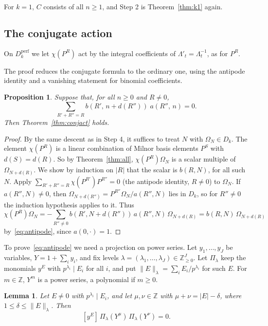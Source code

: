 \documentclass[11pt]{amsart}
\newtheorem{proposition}[theorem]{Proposition}
\newtheorem{lemma}[theorem]{Lemma}
\theoremstyle{definition}
\theoremstyle{remark}
\newcommand{\Dk}{D_k}
\newcommand{\Dperf}{D_k^{\mathrm{perf}}}
\newcommand{\coef}[1]{\left[#1\right]}
\begin{document}
For $k=1$, $C$ consists of all $n\ge1$, and Step 2 is
Theorem~\ref{thm:k1} again.

\subsection{The conjugate action}
On $\Dperf$ we let $\chi(P^R)$ act by the integral coefficients of
$\Lambda'_t=\Lambda_t^{-1}$, as for $P^R$.

The proof reduces the conjugate formula to the ordinary one, using the
antipode identity and a vanishing statement for binomial coefficients.

\begin{proposition}\label{prop:conj}
Suppose that, for all $n\ge0$ and $R\ne0$,
\begin{equation}\label{eq:antipode}
  \sum_{R'+R''=R}b(R',\,n+d(R''))\;a(R'',\,n)=0 .
\end{equation}
Then Theorem~\ref{thm:conjact} holds.
\end{proposition}

\begin{proof}
By the same descent as in Step 4, it suffices to treat $N$ with
$\Omega_N\in\Dk$.  The element $\chi(P^R)$ is a linear combination of Milnor
basis elements $P^S$ with $d(S)=d(R)$.  So by Theorem~\ref{thm:all},
$\chi(P^R)\Omega_N$ is a scalar multiple of $\Omega_{N+d(R)}$.  We show by
induction on $|R|$ that the scalar is $b(R,N)$, for all such $N$.  Apply
$\sum_{R'+R''=R}\chi(P^{R'})P^{R''}=0$ (the antipode identity, $R\ne0$) to
$\Omega_N$.  If $a(R'',N)\ne0$, then $\Omega_{N+d(R'')}=P^{R''}\Omega_N/a(R'',N)$
lies in $\Dk$, so for $R''\ne0$ the induction hypothesis applies to it.  Thus
\[
  \chi(P^R)\Omega_N=-\sum_{R''\ne0}b(R',N+d(R''))\,a(R'',N)\,\Omega_{N+d(R)}
  =b(R,N)\,\Omega_{N+d(R)}
\]
by~\eqref{eq:antipode}, since $a(0,\cdot)=1$.
\end{proof}

To prove~\eqref{eq:antipode} we need a projection on power series.  Let
$y_1,\dots,y_J$ be variables, $Y=1+\sum_iy_i$, and fix levels
$\lambda=(\lambda_1,\dots,\lambda_J)\in\mathbb{Z}_{\ge0}^J$.  Let $\Pi_\lambda$
keep the monomials $y^E$ with $p^{\lambda_i}\mid E_i$ for all $i$, and put
$\|E\|_\lambda=\sum_iE_i/p^{\lambda_i}$ for such $E$.  For $m\in\mathbb{Z}$, $Y^m$
is a power series, a polynomial if $m\ge0$.

\begin{lemma}\label{lem:levels}
Let $E\ne0$ with $p^{\lambda_i}\mid E_i$, and let $\mu,\nu\in\mathbb{Z}$ with
$\mu+\nu=|E|-\delta$, where $1\le\delta\le\|E\|_\lambda$.  Then
\[
  \coef{y^E}\,\Pi_\lambda(Y^\mu)\,\Pi_\lambda(Y^\nu)=0 .
\]
\end{lemma}
\end{document}
